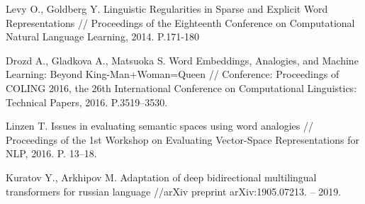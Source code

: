 \documentclass[a4paper,14pt]{article}
\begin{document}
\begin{thebibliography}{30}
Levy O., Goldberg Y. Linguistic Regularities in Sparse and Explicit Word 	Representations // Proceedings of the Eighteenth Conference on Computational Natural Language Learning, 2014. P.171-180

Drozd A., Gladkova A., Matsuoka S. Word Embeddings, Analogies, and Machine Learning: Beyond King-Man+Woman=Queen // Conference: Proceedings of COLING 2016, the 26th International Conference on Computational Linguistics: Technical Papers, 2016. 
P.3519–3530.

Linzen T. Issues in evaluating semantic spaces using word analogies // Proceedings of the 1st Workshop on Evaluating Vector-Space Representations for NLP, 2016. P. 13–18.

Kuratov Y., Arkhipov M. Adaptation of deep bidirectional multilingual transformers for russian language //arXiv preprint arXiv:1905.07213. – 2019.


\end{thebibliography}
\end{document}
